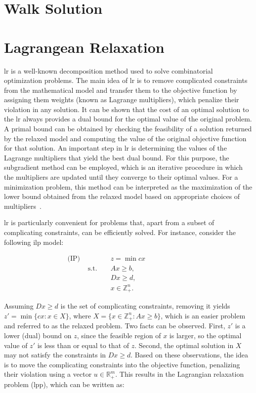 \section{Walk Solution}\label{sec:cbrp-walk-solution}

\section{Lagrangean Relaxation}\label{sec:cbrp-lagrangean-relaxation}

\gls{lr} is a well-known decomposition method used to solve combinatorial
optimization problems. The main idea of \gls{lr} is to remove complicated
constraints from the mathematical model and transfer them to the objective
function by assigning them weights (known as Lagrange multipliers), which
penalize their violation in any solution. It can be shown that the cost of an
optimal solution to the \gls{lr} always provides a dual bound for the optimal
value of the original problem. A primal bound can be obtained by checking the
feasibility of a solution returned by the relaxed model and computing the value
of the original objective function for that solution. An important step in
\gls{lr} is determining the values of the Lagrange multipliers that yield the
best dual bound. For this purpose, the subgradient method can be employed, which
is an iterative procedure in which the multipliers are updated until they
converge to their optimal values. For a minimization problem, this method can be
interpreted as the maximization of the lower bound obtained from the relaxed
model based on appropriate choices of multipliers~\cite{Beasley:1993}.

\gls{lr} is particularly convenient for problems that, apart from a subset of
complicating constraints, can be efficiently solved. For instance, consider the
following \gls{ilp} model:

\begin{align*}
	\text{(IP) } &              &  & z = \min cx           &  &  &  &  &  &  &  &   \\
	             & \text{s.t. } &  & Ax \geq b,            &  &  &  &  &  &  &  &   \\
	             &              &  & Dx \geq d,            &  &  &  &  &  &  &  &   \\
	             &              &  & x \in \mathbb{Z}^n_+. &  &  &  &  &  &  &  & 
\end{align*}

Assuming $Dx \geq d$ is the set of complicating constraints, removing it yields
$z' = \min \{cx : x \in X\}$, where $X = \{x \in \mathbb{Z}^n_+ : Ax \geq b\}$,
which is an easier problem and referred to as the relaxed problem. Two facts can
be observed. First, $z'$ is a lower (dual) bound on $z$, since the feasible
region of $x$ is larger, so the optimal value of $z'$ is less than or equal to
that of $z$. Second, the optimal solution in $X$ may not satisfy the constraints
in $Dx \geq d$. Based on these observations, the idea is to move the
complicating constraints into the objective function, penalizing their violation
using a vector $u \in \mathbb{R}^{m}_+$. This results in the Lagrangian
relaxation problem (\gls{lpp}), which can be written as:

